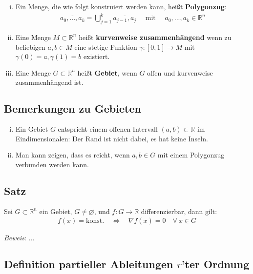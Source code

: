 \documentclass[11pt,a4paper]{book}
\newcommand {\R}	{\mathbb{R}}
\newcommand {\Rn}	{\mathbb{R}^n}
\newcommand{\1}    	{\mathbbm{1}}
\newcommand{\mitt}	{\textrm{ mit }}
\begin{document}
\begin{enumerate}[(i)]
	\item Ein Menge, die wie folgt konstruiert werden kann, heißt \textbf{Polygonzug}:
	\begin{align*}
		\overline{ a_0, ..., a_k} = \bigcup_{j=1}^k \overline{a_{j-1},a_j} \quad\mitt\quad a_0, ..., a_k \in \Rn
	\end{align*}	
	\item Eine Menge \(M \subset \Rn\) heißt \textbf{kurvenweise zusammenhängend} wenn zu beliebigen \(a,b \in M\) eine stetige Funktion \(\gamma : [0,1] \rightarrow M\) mit \(\gamma(0) = a, \gamma(1) = b\) existiert.
	\item Eine Menge \(G \subset \Rn\) heißt \textbf{Gebiet}, wenn \(G\) offen und kurvenweise zusammenhängend ist.
\end{enumerate}


\subsection{Bemerkungen zu Gebieten}

\begin{enumerate}[(i)]
	\item Ein Gebiet \(G\) entspricht einem offenen Intervall \( (a,b) \subset \R\) im Eindimensionalen: Der Rand ist nicht dabei, es hat keine Inseln.
	\item Man kann zeigen, dass es reicht, wenn \(a,b \in G\) mit einem Polygonzug verbunden werden kann.
\end{enumerate}
	
\subsection{Satz}

Sei \(G \subset \Rn\) ein Gebiet, \(G \neq \varnothing\), und \(f : G \rightarrow \R\) differenzierbar, dann gilt:
\begin{align*}
	f(x) = \textrm{konst.} \quad\Leftrightarrow\quad \nabla f(x) = 0 \quad \forall~ x \in G
\end{align*}

\textit{Beweis}: ...


\subsection{Definition partieller Ableitungen \(r\)'ter Ordnung}
\end{document}
